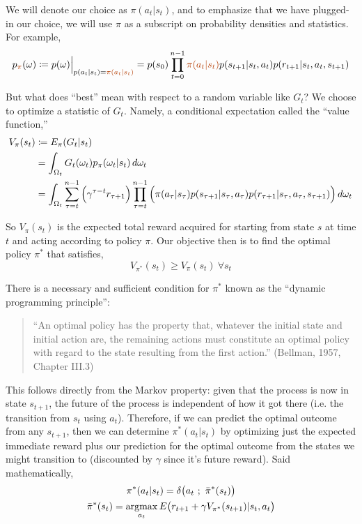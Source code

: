 We will denote our choice as $\pi(a_t|s_t)$, and to emphasize that we have plugged-in our choice, we will use $\pi$ as a subscript on probability densities and statistics. For example,
\begin{equation*}
p_{\orange{\pi}}(\omega) \coloneqq p(\omega)\Big{|}_{p(a_t|s_t) = \orange{\pi(a_t|s_t)}} = p(s_0) \prod_{t=0}^{n-1} \orange{\pi(a_t|s_t)}p(s_{t+1}|s_t,a_t)p(r_{t+1}|s_t,a_t,s_{t+1})
\end{equation*}

But what does ``best'' mean with respect to a random variable like $G_t$? We choose to optimize a statistic of $G_t$. Namely, a conditional expectation called the ``value function,''
\begin{align*}
V_\pi(s_t) &\coloneqq E_\pi(G_t | s_t)\\
&= \int_{\Omega_t} G_t(\omega_t) p_\pi(\omega_t|s_t)\,d\omega_t\\
&= \int_{\Omega_t} \sum_{\tau=t}^{n-1} \Big{(}\gamma^{\tau-t} r_{\tau+1}\Big{)} \prod_{\tau=t}^{n-1} \Big{(}\pi(a_\tau|s_\tau)p(s_{\tau+1}|s_\tau,a_\tau)p(r_{\tau+1}|s_\tau,a_\tau,s_{\tau+1})\Big{)} \,d\omega_t
\end{align*}

So $V_\pi(s_t)$ is the expected total reward acquired for starting from state $s$ at time $t$ and acting according to policy $\pi$. Our objective then is to find the optimal policy $\pi^*$ that satisfies,
\begin{equation*}
V_{\pi^*}(s_t) \geq V_{\pi}(s_t)\ \forall s_t
\end{equation*}

There is a necessary and sufficient condition for $\pi^*$ known as the ``dynamic programming principle'':
\begin{quote}
``An optimal policy has the property that, whatever the initial state and initial action are, the remaining actions must constitute an optimal policy with regard to the state resulting from the first action.'' (Bellman, 1957, Chapter III.3)
\end{quote}

This follows directly from the Markov property: given that the process is now in state $s_{t+1}$, the future of the process is independent of how it got there (i.e. the transition from $s_t$ using $a_t$). Therefore, if we can predict the optimal outcome from any $s_{t+1}$, then we can determine $\pi^*(a_t|s_t)$ by optimizing just the expected immediate reward plus our prediction for the optimal outcome from the states we might transition to (discounted by $\gamma$ since it's future reward). Said mathematically,
\begin{gather*}
\pi^*(a_t|s_t) = \delta\big{(}a_t\ ;\ \bar{\pi}^*(s_t)\big{)}\\
\bar{\pi}^*(s_t) = \operatorname*{argmax}_{a_t} E\big{(}r_{t+1} + \gamma V_{\pi^*}(s_{t+1}) | s_t, a_t\big{)}
\end{gather*}

